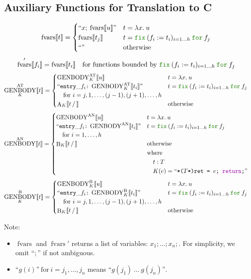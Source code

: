 \documentclass[a4paper,fleqn]{article}
\newcommand{\kwfix}{\mbox{\color{mygreen}\ttfamily fix}}
\newcommand{\kwfor}{\mbox{\color{mygreen}\ttfamily for}}
\newcommand{\lam}[2]{\lambda #1.\:#2}
\newcommand{\fix}[4]{\kwfix\:(#1 := #2)_{#3}\:\kwfor\:#4}
\newcommand{\BRA}[1]{\llbracket #1 \rrbracket}
\DeclareMathOperator{\genbody}{GENBODY}
\newcommand{\genbodyat}[2]{\genbody^\mathrm{AT}_{#1}\BRA{#2}}
\newcommand{\genbodyan}[1]{\genbody^\mathrm{AN}\BRA{#1}}
\newcommand{\genbodyb}[2]{\genbody^\mathrm{B}_{#1}\BRA{#2}}
\newcommand{\dq}[1]{\text{``}#1\text{''}}
\newcommand{\ttcolon}{\texttt{:}}
\newcommand{\kwCreturn}{\mbox{\color{myviolet}\ttfamily return}}
\DeclareMathOperator{\fvarsop}{fvars}
\newcommand{\fvars}[1]{\fvarsop\BRA{#1}}
\newcommand{\fvarsd}[1]{\fvarsop'\BRA{#1}}
\DeclareMathOperator{\Aop}{A}
\DeclareMathOperator{\Bop}{B}
\newcommand{\A}[3]{\Aop_{#1}\BRA{#2\,/\,#3}}
\newcommand{\B}[3]{\Bop_{#1}\BRA{#2\,/\,#3}}
\begin{document}
\subsection{Auxiliary Functions for Translation to C}\label{sec:aux-function}
\[
  \fvars{t} =
  \begin{cases}
    \dq{x;\:\fvars{u}} & t = \lam{x}{u} \\
    \fvars{t_j}       & t = \fix{f_i}{t_i}{i=1\ldots h}{f_j} \\
    \dq{}             & \text{otherwise}
  \end{cases}
\]
\[
  \fvarsd{f_i} = \fvars{t_i} \quad \text{for functions bounded by $\fix{f_i}{t_i}{i=1\ldots h}{f_j}$}
\]
\[
  \genbodyat{K}{t} =
  \begin{cases}
    \genbodyat{K}{u}                            & t = \lam{x}{u} \\
    \dq{\mathtt{entry\_}f_i\ttcolon\:\genbodyat{K}{t_i}} & t = \fix{f_i}{t_i}{i=1\ldots h}{f_j} \\
    \quad \text{for}~i=j, 1,\dotsc, (j-1), (j+1),\dotsc, h \\
    \A{K}{t}{}                            & \text{otherwise}
  \end{cases}
\]
\[
  \genbodyan{t} =
  \begin{cases}
    \genbodyan{u}                            & t = \lam{x}{u} \\
    \dq{\mathtt{entry\_}f_i\ttcolon\:\genbodyan{t_i}} & t = \fix{f_i}{t_i}{i=1\ldots h}{f_j} \\
    \quad \text{for}~i=1,\dotsc, h \\
    \B{K}{t}{}                            & \begin{aligned}[t]
                                            & \text{otherwise} \\
                                            & \text{where} \\
                                            & \quad t:T \\
                                            & \quad K(e) = \dq{\texttt{*($T$*)ret = $e$; \kwCreturn;}}
                                            \end{aligned}
  \end{cases}
\]
\[
  \genbodyb{K}{t} =
  \begin{cases}
    \genbodyb{K}{u}                            & t = \lam{x}{u} \\
    \dq{\mathtt{entry\_}f_i\ttcolon\:\genbodyb{K}{t_i}} & t = \fix{f_i}{t_i}{i=1\ldots h}{f_j} \\
    \quad \text{for}~i=j, 1,\dotsc, (j-1), (j+1),\dotsc, h \\
    \B{K}{t}{}                            & \text{otherwise}
  \end{cases}
\]
{\small Note:
\begin{itemize}
  \item $\fvarsop$ and $\fvarsop'$ returns a list of variables: $x_1;\ldots;x_n;$.  For simplicity, we omit ``$;$'' if not ambiguous.
  \item $\dq{g(i)}~\text{for}~i=j_1,\dotsc,j_n$ means $\dq{g(j_1)\:\ldots\:g(j_n)}$.
\end{itemize}}
\end{document}
